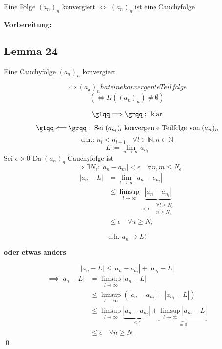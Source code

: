 \documentclass[fleqn]{scrbook}
\newcommand{\mqq}[1]{\text{\glqq} #1\text{\grqq}}
\newcommand{\N}{\mathbb{N}}
\renewenvironment{proof}{{\bfseries Beweis }}{\qed}
\begin{document}
Eine Folge $(a_n)_n$ konvergiert $\Longleftrightarrow$ $(a_n)_n$ ist eine Cauchyfolge

\textbf{Vorbereitung:} %

\subsection{Lemma 24}

Eine Cauchyfolge $(a_n)_n$ konvergiert

\[\Longleftrightarrow (a_n)_n hat eine konvergente Teilfolge\]
\[(\Longleftrightarrow H((a_n)_n) \neq \emptyset )\]

\begin{proof}
  \[\mqq{\Longrightarrow}: \text{ klar}\]
  \[\mqq{\Longleftarrow}: \text{ Sei } (a_{n_l})_l \text{ konvergente Teilfolge von } (a_n)_n\]
  \[\text{d.h.: } n_l < n_{l+1} \quad \forall l \in \N,n\in \N\]
  \[L:= \lim_{n \to \infty} a_{n_l}\]
  Sei $\epsilon > 0$ Da $(a_n)_n$ Cauchyfolge ist
  \[\implies \exists N_\epsilon: |a_n-a_m| < \epsilon \quad \forall n,m \leq N_\epsilon\]
  \begin{align*}
    |a_n-L| & = \lim_{l \to \infty}|a_n-a_{n_l}| \\
            & \leq \limsup_{l \to \infty}\underbrace{|a_n-a_{n_l}|}_{<\epsilon \quad \substack{\forall l\geq N_\epsilon\\n\geq N_\epsilon}} \\
            & \leq \epsilon \quad \forall n \geq N_\epsilon
  \end{align*}

  \[\text{d.h. } a_n \to L!\]

\textbf{oder etwas anders}

  \[|a_n-L| \leq |a_n-a_{n_l}|+|a_{n_l}-L|\]
  \begin{align*}
    \implies |a_n-L| & = \limsup_{l\to\infty}|a_n-L| \\
                     & \leq \limsup_{l\to\infty}\left(|a_n-a_{n_l}|+|a_{n_l}-L|\right) \\
                     & \leq \limsup_{l\to\infty}\underbrace{|a_n-a_{n_l}|}_{<\epsilon}+\underbrace{\limsup_{l \to \infty} |a_{n_l}-L|}_{=0} \\
                     & \leq \epsilon \quad \forall n \geq N_\epsilon
  \end{align*}
\end{proof}
\end{document}
